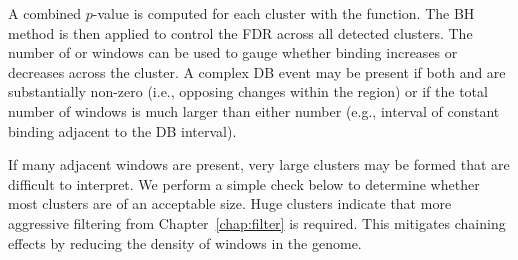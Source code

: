 \documentclass{report}\usepackage[]{graphicx}\usepackage[usenames,dvipsnames]{color}
\newcommand{\hlopt}[1]{\textcolor[rgb]{0,0,0}{#1}}%
\newcommand{\hlstd}[1]{\textcolor[rgb]{0.251,0.251,0.251}{#1}}%
\newcommand{\hlkwb}[1]{\textcolor[rgb]{0,0,0}{#1}}%
\newcommand{\hlkwd}[1]{\textcolor[rgb]{0.878,0.439,0.125}{#1}}%
\newenvironment{knitrout}{}{} %
\begin{document}
A combined $p$-value is computed for each cluster with the  function.
The BH method is then applied to control the FDR across all detected clusters.
The number of  or  windows can be used to gauge whether binding increases or decreases across the cluster.
A complex DB event may be present if both  and  are substantially non-zero (i.e., opposing changes within the region) or if the total number of windows is much larger than either number (e.g., interval of constant binding adjacent to the DB interval).

\begin{knitrout}
\color{fgcolor}
\end{knitrout}

If many adjacent windows are present, very large clusters may be formed that are difficult to interpret. 
We perform a simple check below to determine whether most clusters are of an acceptable size. 
Huge clusters indicate that more aggressive filtering from Chapter~\ref{chap:filter} is required.  
This mitigates chaining effects by reducing the density of windows in the genome.


\begin{knitrout}
\color{fgcolor}
\end{knitrout}
\end{document}

